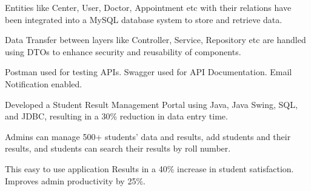 \documentclass[]{deedy-resume-openfont}
\begin{document}
\begin{minipage}[t]{0.66\textwidth}
\begin{tightemize}
\item Entities like Center, User, Doctor, Appointment etc with their relations have been integrated into a MySQL database system to store and retrieve data.

\item Data Transfer between layers like Controller, Service, Repository etc are handled using DTOs to enhance security and reusability of components. 
\item Postman used for testing APIs. Swagger used for API Documentation. Email Notification enabled.
\end{tightemize}
\sectionsep


\begin{tightemize}
\item Developed a Student Result Management Portal using Java, Java Swing, SQL, and JDBC, resulting in a 30\% reduction in data entry time. 
\item Admins can manage 500+ students' data and results, add students and their results, and students can search their results by roll number.
\item This easy to use application Results in a 40\% increase in student satisfaction. Improves admin productivity by 25\%.
\end{tightemize}
\sectionsep





\end{minipage}
\end{document}
